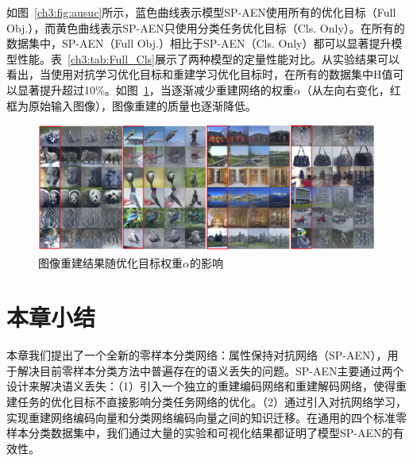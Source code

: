 \begin{table}[htbp]
\centering
{}
\caption{SP-AEN在不同优化目标条件下的性能对比}
\label{ch3:tab:Full_Cls}
\end{table}

如图~\ref{ch3:fig:ausuc}所示，蓝色曲线表示模型SP-AEN使用所有的优化目标（Full Obj.），而黄色曲线表示SP-AEN只使用分类任务优化目标（Cls. Only）。在所有的数据集中，SP-AEN（Full Obj.）相比于SP-AEN（Cls. Only）都可以显著提升模型性能。表~\ref{ch3:tab:Full_Cls}展示了两种模型的定量性能对比。从实验结果可以看出，当使用对抗学习优化目标和重建学习优化目标时，在所有的数据集中H值可以显著提升超过10\%。如图~\ref{ch3:fig:alpha_influence}，当逐渐减少重建网络的权重$\alpha$（从左向右变化，红框为原始输入图像），图像重建的质量也逐渐降低。

\begin{figure}[ht]
    \centering
    \includegraphics[width=0.99\linewidth]{chapter3/res/alpha_influence.pdf}
    \caption{图像重建结果随优化目标权重$\alpha$的影响}
\label{ch3:fig:alpha_influence}
\end{figure}


\section{本章小结}

本章我们提出了一个全新的零样本分类网络：属性保持对抗网络（SP-AEN），用于解决目前零样本分类方法中普遍存在的语义丢失的问题。SP-AEN主要通过两个设计来解决语义丢失：（1）引入一个独立的重建编码网络和重建解码网络，使得重建任务的优化目标不直接影响分类任务网络的优化。（2）通过引入对抗网络学习，实现重建网络编码向量和分类网络编码向量之间的知识迁移。在通用的四个标准零样本分类数据集中，我们通过大量的实验和可视化结果都证明了模型SP-AEN的有效性。


